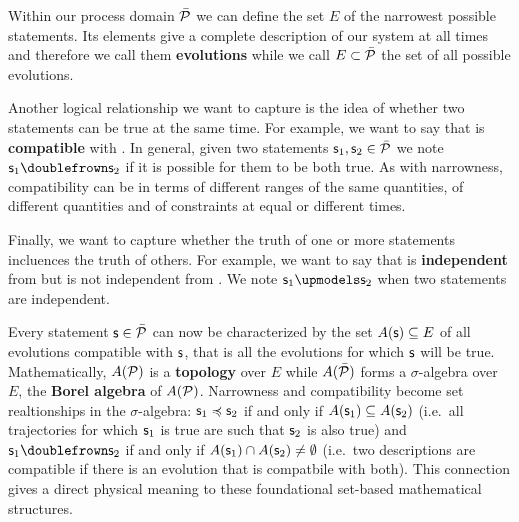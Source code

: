 \documentclass[letterpaper]{article}
\begin{document}
Within our process domain $\tdomain[P]$ we can define the set $E$ of the narrowest possible statements. Its elements give a complete description of our system at all times and therefore we call them \textbf{evolutions} while we call $E \subset \tdomain[P]$ the set of all possible evolutions.

Another logical relationship we want to capture is the idea of whether two statements can be true at the same time. For example, we want to say that  is \textbf{compatible} with . In general, given two statements $\stmt_1, \stmt_2 \in \tdomain[P]$ we note $\stmt_1 \comp \stmt_2$ if it is possible for them to be both true. As with narrowness, compatibility can be in terms of different ranges of the same quantities, of different quantities and of constraints at equal or different times.

Finally, we want to capture whether the truth of one or more statements incluences the truth of others. For example, we want to say that  is \textbf{independent} from  but is not independent from . We note $\stmt_1 \indep \stmt_2$ when two statements are independent.

Every statement $\stmt \in \tdomain[P]$ can now be characterized by the set $A(\stmt) \subseteq E$ of all evolutions compatible with $\stmt$, that is all the evolutions for which $\stmt$ will be true. Mathematically,  $A(\edomain[P])$ is a \textbf{topology} over $E$ while $A(\tdomain[P])$ forms a $\sigma$-algebra over $E$, the \textbf{Borel algebra} of $A(\edomain[P])$. Narrowness and compatibility become set realtionships in the $\sigma$-algebra: $\stmt_1 \narrower \stmt_2$ if and only if $A(\stmt_1) \subseteq A(\stmt_2)$ (i.e.~all trajectories for which $\stmt_1$ is true are such that $\stmt_2$ is also true) and $\stmt_1 \comp \stmt_2$ if and only if $A(\stmt_1) \cap A(\stmt_2) \neq \emptyset$ (i.e.~two descriptions are compatible if there is an evolution that is compatbile with both). This connection gives a direct physical meaning to these foundational set-based mathematical structures.
\end{document}
